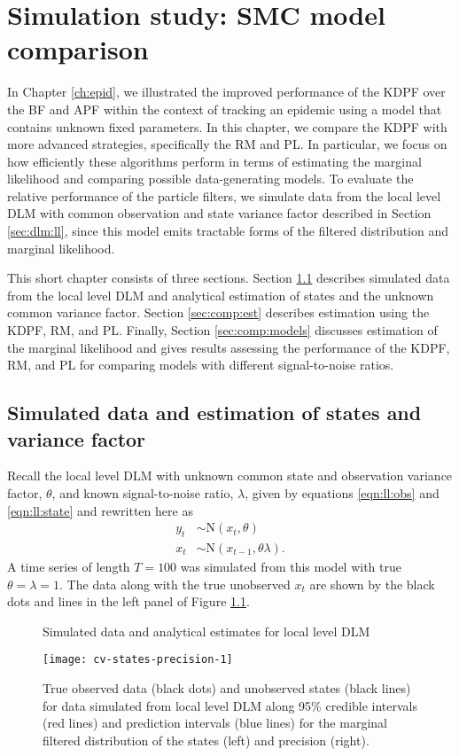 \chapter{Simulation study: SMC model comparison \label{ch:comp}}

In Chapter \ref{ch:epid}, we illustrated the improved performance of the KDPF over the BF and APF within the context of tracking an epidemic using a model that contains unknown fixed parameters. In this chapter, we compare the KDPF with more advanced strategies, specifically the RM and PL. In particular, we focus on how efficiently these algorithms perform in terms of estimating the marginal likelihood and comparing possible data-generating models. To evaluate the relative performance of the particle filters, we simulate data from the local level DLM with common observation and state variance factor described in Section \ref{sec:dlm:ll}, since this model emits tractable forms of the filtered distribution and marginal likelihood.

This short chapter consists of three sections. Section \ref{sec:comp:data} describes simulated data from the local level DLM and analytical estimation of states and the unknown common variance factor. Section \ref{sec:comp:est} describes estimation using the KDPF, RM, and PL. Finally, Section \ref{sec:comp:models} discusses estimation of the marginal likelihood and gives results assessing the performance of the KDPF, RM, and PL for comparing models with different signal-to-noise ratios.

\section{Simulated data and estimation of states and variance factor} \label{sec:comp:data}

Recall the local level DLM with unknown common state and observation variance factor, $\theta$, and known signal-to-noise ratio, $\lambda$, given by equations \eqref{eqn:ll:obs} and \eqref{eqn:ll:state} and rewritten here as
\begin{align*}
y_t &\sim \mbox{N}(x_t, \theta) \\
x_t &\sim \mbox{N}(x_{t-1}, \theta\lambda).
\end{align*}
A time series of length $T = 100$ was simulated from this model with true $\theta = \lambda = 1$. The data along with the true unobserved $x_t$ are shown by the black dots and lines in the left panel of Figure \ref{fig:comp:data}.

\begin{figure}[ht]
\ssp
\centering
\caption{Simulated data and analytical estimates for local level DLM} \label{fig:comp:data}
\texttt{[image: cv-states-precision-1]}
\caption*{True observed data (black dots) and unobserved states (black lines) for data simulated from local level DLM along 95\% credible intervals (red lines) and prediction intervals (blue lines) for the marginal filtered distribution of the states (left) and precision (right).}
\end{figure}

